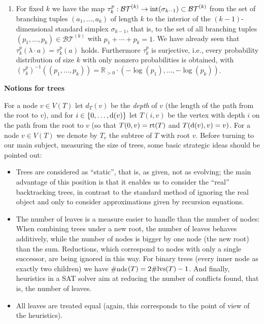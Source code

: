 \documentclass{report}
\begin{document}
\begin{enumerate}
\begin{enumerate}
				\item  For fixed $k$ we have the map $\tau^p_k: \mathcal{BT}^{(k)}\to {\rm int}(\sigma_{k-1} ) \subset \mathcal{BT}^{(k)}$
				from the set
				of branching tuples $(a_1 ,\ldots,a_k )$ of length $k$ to the interior of the $(k - 1)$-dimensional standard simplex $\sigma_{k-1}$, that is, to the set of all branching
				tuples $(p_1 ,\ldots,p_k ) \in \mathcal{BT}^{(k)}$
				with $p_1 + \cdots + p_k = 1$. We have already seen
				that $\tau^p_k (\lambda \cdot a) = \tau^p_k (a)$ holds. Furthermore $\tau^p_k$
				is surjective, i.e., every probability distribution of size $k$ with only nonzero probabilities is obtained,
				with $(\tau^p_k )^{-1} ((p_1 ,\ldots,p_k )) = {\mathbb{R}}_{>0}\cdot (-\log(p_1 ),\ldots,-\log(p_k ))$.
			\end{enumerate}
			
			{\bf Notions for trees}
			
			For a node $v \in V (T)$ let $d_T (v)$ be the {\it depth} of $v$ (the length of the path from
			the root to $v$), and for $i \in \{0,\ldots,{\rm d}(v)\}$ let $T(i,v)$ be the vertex with depth $i$ on
			the path from the root to $v$ (so that $T(0,v) = {\rm rt}(T) $ and $T({\rm d}(v),v) = v)$. For a
			node $v \in V (T)$ we denote by $T_v$ the subtree of $T$ with root $v$. Before turning to
			our main subject, measuring the size of trees, some basic strategic ideas should
			be pointed out:
			\begin{itemize}
				\item Trees are considered as ``static'', that is, as given, not as evolving; the
				main advantage of this position is that it enables us to consider the ``real''
				backtracking trees, in contrast to the standard method of ignoring the real
				object and only to consider approximations given by recursion equations.
				
				\item The number of leaves is a measure easier to handle than the number of nodes: When combining trees under a new root, the number of leaves
				behaves additively, while the number of nodes is bigger by one node (the
				new root) than the sum. Reductions, which correspond to nodes with only
				a single successor, are being ignored in this way. For binary trees (every
				inner node as exactly two children) we have \#nds$(T) = 2\#{\rm lvs}(T)-1$. And
				finally, heuristics in a SAT solver aim at reducing the number of conflicts
				found, that is, the number of leaves.
				
				\item All leaves are treated equal (again, this corresponds to the point of view of
				the heuristics).
			\end{itemize}
			

\end{enumerate}
\end{document}
